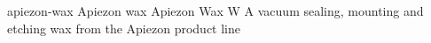 \newglsXchemical%
{apiezon-wax}%
{Apiezon wax}%
{Apiezon Wax W}%
{A vacuum sealing, mounting and etching wax from the Apiezon\textsuperscript{\textregistered} product line}%